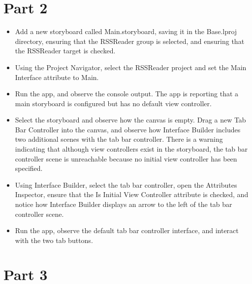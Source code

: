 \documentclass[a4paper,11pt]{scrartcl}
\begin{document}
\section*{Part 2}

\begin{itemize}
\item Add a new storyboard called Main.storyboard, saving it in the Base.lproj directory, ensuring that the RSSReader group is selected, and ensuring that the RSSReader target is checked. 
\item Using the Project Navigator, select the RSSReader project and set the Main Interface attribute to Main.
\item Run the app, and observe the console output. The app is reporting that a main storyboard is configured but has no default view controller.
\item Select the storyboard and observe how the canvas is empty. Drag a new Tab Bar Controller into the canvas, and observe how Interface Builder includes two additional scenes with the tab bar controller. There is a warning indicating that although view controllers exist in the storyboard, the tab bar controller scene is unreachable because no initial view controller has been specified.
\item Using Interface Builder, select the tab bar controller, open the Attributes Inspector, ensure that the Is Initial View Controller attribute is checked, and notice how Interface Builder displays an arrow to the left of the tab bar controller scene.
\item Run the app, observe the default tab bar controller interface, and interact with the two tab buttons.
\end{itemize}

\section*{Part 3}
\end{document}
